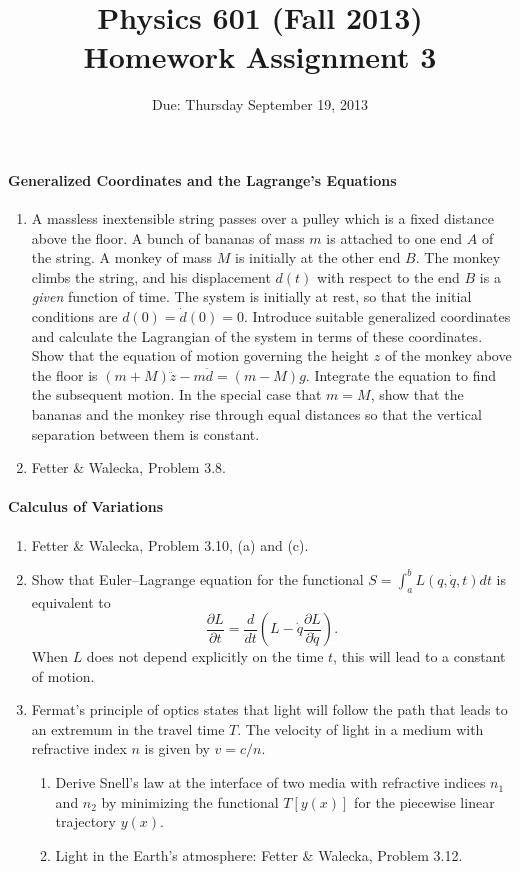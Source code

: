 \documentclass[letterpaper,11pt]{article}
\title{Physics 601 (Fall 2013) \\ Homework Assignment 3}
\date{Due: Thursday September 19, 2013}
\begin{document}
\maketitle

\paragraph*{Generalized Coordinates and the Lagrange's Equations}
\begin{enumerate}
 \item A massless inextensible string passes over a pulley which is a fixed distance above the floor.  A bunch of bananas of mass $m$ is attached to one end $A$ of the string.  A monkey of mass $M$ is initially at the other end $B$. The monkey climbs the string, and his displacement $d(t)$ with respect to the end $B$ is a \emph{given} function of time.  The system is initially at rest, so that the initial conditions are $d(0) = \dot{d}(0) = 0$.  Introduce suitable generalized coordinates and calculate the Lagrangian of the system in terms of these coordinates.  Show that the equation of motion governing the height $z$ of the monkey above the floor is $(m+M)\ddot{z} - m\ddot{d} = (m-M)g$.  Integrate the equation to find the subsequent motion.  In the special case that $m = M$, show that the bananas and the monkey rise through equal distances so that the vertical separation between them is constant.
 \item Fetter \& Walecka, Problem 3.8.
\end{enumerate}


\paragraph*{Calculus of Variations}
\begin{enumerate}[resume]
 \item Fetter \& Walecka, Problem 3.10, (a) and (c).
 \item Show that Euler--Lagrange equation for the functional $S = \int_a^b L(q,\dot{q},t) dt$ is equivalent to
  \begin{equation}
   \frac{\partial L}{\partial t} = \frac{d}{dt} \left( L - \dot{q} \frac{\partial L}{\partial \dot{q}} \right).
  \end{equation}
 When $L$ does not depend explicitly on the time $t$, this will lead to a constant of motion.
 \item Fermat's principle of optics states that light will follow the path that leads to an extremum in the travel time $T$.  The velocity of light in a medium with refractive index $n$ is given by $v = c/n$.
 \begin{enumerate}
  \item Derive Snell's law at the interface of two media with refractive indices $n_1$ and $n_2$ by minimizing the functional $T[y(x)]$ for the piecewise linear trajectory $y(x)$.
  \item Light in the Earth's atmosphere: Fetter \& Walecka, Problem 3.12.
 \end{enumerate}
\end{enumerate}
\end{document}
